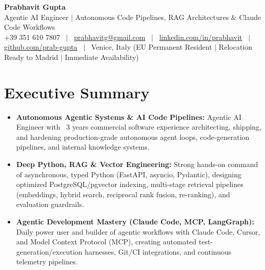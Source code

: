 \documentclass[a4paper,10pt]{article}
\begin{document}
\begin{minipage}[c]{0.80\textwidth}
  {\Huge\bfseries Prabhavit Gupta}\\[3pt]
  {\color{accent}\large Agentic AI Engineer $\vert$ Autonomous Code Pipelines, RAG Architectures $\&$ Claude Code Workflows}\\[6pt]
  {\footnotesize +39 351 610 7807 ~$\vert$~
  \href{mailto:prabhavitg@gmail.com}{prabhavitg@gmail.com} ~$\vert$~
  \href{https://www.linkedin.com/in/prabhavit/}{linkedin.com/in/prabhavit} ~$\vert$~
  \href{https://github.com/prab-gupta}{github.com/prab-gupta} ~$\vert$~
  Venice, Italy (EU Permanent Resident $\vert$ Relocation Ready to Madrid $\vert$ Immediate Availability)}
\end{minipage}\hfill

\vspace{6pt}

\section{Executive Summary}
\begin{itemize}
  \item \textbf{Autonomous Agentic Systems \& AI Code Pipelines:} Agentic AI Engineer with ~3 years commercial software experience architecting, shipping, and hardening production-grade autonomous agent loops, code-generation pipelines, and internal knowledge systems.
  \item \textbf{Deep Python, RAG \& Vector Engineering:} Strong hands-on command of asynchronous, typed Python (FastAPI, asyncio, Pydantic), designing optimized PostgreSQL/pgvector indexing, multi-stage retrieval pipelines (embeddings, hybrid search, reciprocal rank fusion, re-ranking), and evaluation guardrails.
  \item \textbf{Agentic Development Mastery (Claude Code, MCP, LangGraph):} Daily power user and builder of agentic workflows with Claude Code, Cursor, and Model Context Protocol (MCP), creating automated test-generation/execution harnesses, Git/CI integrations, and continuous telemetry pipelines.
\end{itemize}

\end{document}
